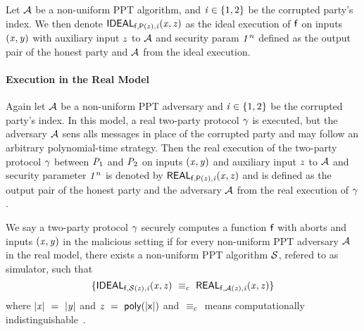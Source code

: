 Let $\mathcal{A}$ be a non-uniform PPT algorithm, and $\mathit{i} \in \{1,2\}$ be the corrupted party's index.
We then denote $\mathsf{IDEAL}_{\mathsf{f}, \mathsf{P}(\mathit{z}), \mathit{i}}(\mathit{x}, \mathit{z})$ as the ideal execution of $\mathsf{f}$ on inputs $(\mathit{x}, \mathit{y})$ with auxiliary input $\mathit{z}$ to $\mathcal{A}$ and security param $\mathit{1^n}$ defined as the output pair of the honest party and $\mathcal{A}$ from the ideal execution.

\paragraph{Execution in the Real Model} Again let $\mathcal{A}$ be a non-uniform PPT adversary and $\mathit{i} \in \{1,2\}$ be the corrupted party's index.
In this model, a real two-party protocol $\gamma$ is executed, but the adversary $\mathcal{A}$ sens alls messages in place of the corrupted party and may follow an arbitrary polynomial-time strategy.
Then the real execution of the two-party protocol $\gamma$ between $\mathit{P}_{1}$ and $\mathit{P}_{2}$ on inputs $(\mathit{x}, \mathit{y})$ and auxiliary input $\mathit{z}$ to $\mathcal{A}$ and security parameter $\mathit{1^n}$ is denoted by $\mathsf{REAL}_{\mathsf{f}, \mathsf{P}(\mathit{z}), \mathit{i}}(\mathit{x}, \mathit{z})$ and is defined as the output pair of the honest party and the adversary $\mathcal{A}$ from the real execution of $\gamma$.

\begin{definition}\label{subsec:pre:security}
    We say a two-party protocol $\gamma$ securely computes a function $\mathsf{f}$ with aborts and inputs $(\mathit{x}, \mathit{y})$ in the malicious setting if for every non-uniform PPT adversary $\mathcal{A}$ in the real model, there exists a non-uniform PPT algorithm $\mathcal{S}$, refered to as simulator, such that
    \[
        \{ \mathsf{IDEAL}_{\mathsf{f}, \mathcal{S}(\mathit{z}), \mathit{i}}(\mathit{x}, \mathit{z}) ~\equiv_{c}~ \mathsf{REAL}_{\mathsf{f}, \mathcal{A}(\mathit{z}), \mathit{i}}(\mathit{x}, \mathit{z}) \}
    \]
    where $|\mathit{x}| ~=~ |\mathit{y}|$ and $\mathit{z} ~=~ \mathsf{poly(|x|)}$ and $~\equiv_{c}~$ means computationally indistinguishable~\cite{lindell2017simulate}.
\end{definition}